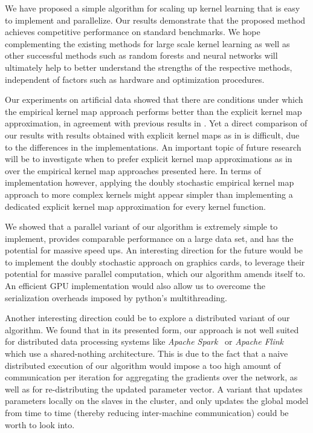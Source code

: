 \documentclass{article} %
\begin{document}
We have proposed a simple algorithm for scaling up kernel learning that is easy to implement and parallelize. Our results demonstrate that the proposed method achieves competitive performance on standard benchmarks. We hope complementing the existing methods for large scale kernel learning as well as other successful methods such as random forests and neural networks will ultimately help to better understand the strengths of the respective methods, independent of factors such as hardware and optimization procedures. 

Our experiments on artificial data showed that there are conditions under which the empirical kernel map approach performs better than the explicit kernel map approximation, in agreement with previous results in \cite{Vedaldi2010}. Yet a direct comparison of our results with results obtained with explicit kernel maps as in \cite{Dai2014} is difficult, due to the differences in the implementations. An important topic of future research will be to investigate when to prefer explicit kernel map approximations as in \cite{Rahimi2008, Dai2014} over the empirical kernel map approaches presented here. In terms of implementation however, applying the doubly stochastic empirical kernel map approach to more complex kernels might appear simpler than implementing a dedicated explicit kernel map approximation for every kernel function. 

We showed that a parallel variant of our algorithm is extremely simple to implement, provides comparable performance on a large data set, and has the potential for massive speed ups. An interesting direction for the future would be to implement the doubly stochastic approach on graphics cards, to leverage their potential for massive parallel computation, which our algorithm amends itself to. An efficient GPU implementation would also allow us to overcome the serialization overheads imposed by python's multithreading.

Another interesting direction could be to explore a distributed variant of our algorithm. We found that in its presented form, our approach is not well suited for distributed data processing systems like \textit{Apache Spark}~\cite{Zaharia2012} or \textit{Apache Flink}~\cite{Alexandrov2014} which use a shared-nothing architecture. This is due to the fact that a naive distributed execution of our algorithm would impose a too high amount of communication per iteration for aggregating the gradients over the network, as well as for re-distributing the updated parameter vector. A variant that updates parameters locally on the slaves in the cluster, and only updates the global model from time to time (thereby reducing inter-machine communication) could be worth to look into. 

\newpage

{\small
  
  }
\end{document}
